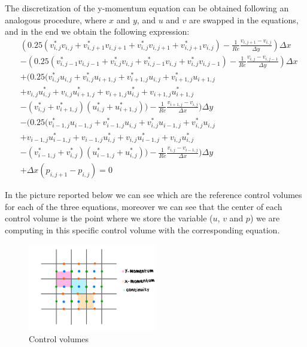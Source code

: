\documentclass{article}
\begin{document}
The discretization of the y-momentum equation can be obtained following an analogous procedure, where $x$ and $y$, and $u$ and $v$ are swapped in the equations, and in the end we obtain the following expression:
\begin{equation}
  \begin{aligned}
    & (0.25 (v^*_{i,j} v_{i,j} + v^*_{i,j+1} v_{i,j+1} + v^*_{i,j} v_{i,j+1} + v^*_{i,j+1} v_{i,j}) - \frac{1}{Re} \frac{v_{i,j+1} - v_{i,j}}{\Delta y}) \Delta x  \\
    & - (0.25 (v^*_{i,j-1} v_{i,j-1} + v^*_{i,j} v_{i,j} + v^*_{i,j-1} v_{i,j} + v^*_{i,j} v_{i,j-1}) - \frac{1}{Re} \frac{v_{i,j} - v_{i,j-1}}{\Delta y}) \Delta x \\
    & + (0.25 (v^*_{i,j}u_{i,j} + v^*_{i,j}u_{i+1,j} + v^*_{i+1,j}u_{i,j} + v^*_{i+1,j}u_{i+1,j} \\
    & + v_{i,j}u^*_{i,j} + v_{i,j}u^*_{i+1,j} + v_{i+1,j}u^*_{i,j} + v_{i+1,j}u^*_{i+1,j} \\
    & - (v^*_{i,j} + v^*_{i+1,j}) (u^*_{i,j} + u^*_{i+1,j})) - \frac{1}{Re} \frac{v_{i+1,j} - v_{i,j}}{\Delta x}) \Delta y \\
    & - (0.25 (v^*_{i-1,j}u_{i-1,j} + v^*_{i-1,j}u_{i,j} + v^*_{i,j}u_{i-1,j} + v^*_{i,j}u_{i,j} \\
    & + v_{i-1,j}u^*_{i-1,j} + v_{i-1,j}u^*_{i,j} + v_{i,j}u^*_{i-1,j} + v_{i,j}u^*_{i,j} \\
    & - (v^*_{i-1,j} + v^*_{i,j}) (u^*_{i-1,j} + u^*_{i,j})) - \frac{1}{Re} \frac{v_{i,j} - v_{i-1,j}}{\Delta x}) \Delta y \\
    & + \Delta x (p_{i,j+1} - p_{i,j}) = 0
  \end{aligned}
\end{equation}

In the picture reported below we can see which are the reference control volumes for each of the three equations, moreover we can see
that the center of each control volume is the point where we store the variable ($u$, $v$ and $p$) we are computing in this specific control volume with the corresponding equation.

\begin{figure}[h!]
  \centering
  \includegraphics[width=0.5\textwidth]{controlvolumes.jpg}
  \caption{Control volumes}
\end{figure}
\end{document}
